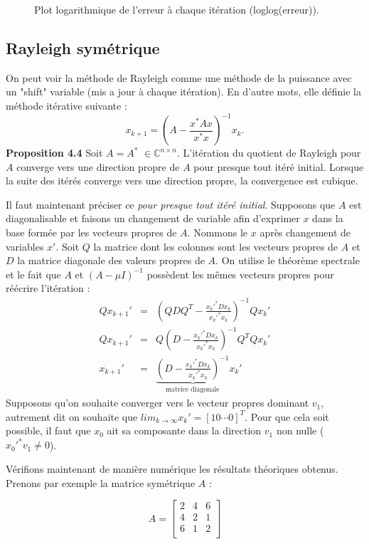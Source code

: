 \begin{figure}
\begin{tabular}{cc}
\end{tabular}
\caption{Plot logarithmique de l'erreur à chaque itération (loglog(erreur)). }
\label{plor_erreur}
\end{figure}

\subsection*{Rayleigh symétrique}
On peut voir la méthode de Rayleigh comme une méthode de la puissance avec un "shift" variable (mis a jour à chaque itération). En d'autre mots, elle définie la méthode itérative suivante : 
$$x_{k+1} = \left(  A- \frac{x^*Ax}{x^*x}  \right)^{-1} x_k.  $$
\textbf{Proposition 4.4} Soit $A = A^*$ $ \in \mathbb{C}^{n\times n}$. L'itération du quotient de Rayleigh pour $A$ converge vers une direction propre de $A$ pour presque tout itéré initial. Lorsque la suite des itérés converge vers une direction propre, la convergence est cubique. 

Il faut maintenant préciser ce \textit{pour presque tout itéré initial}. Supposons que $A$ est diagonalisable et faisons un changement de variable afin d'exprimer $x$ dans la base formée par les vecteurs propres de $A$. Nommons le $x$ après changement de variables $x'$. Soit $Q$ la matrice dont les colonnes sont les vecteurs propres de $A$ et $D$ la matrice diagonale des valeurs propres de $A$. On utilise le théorème spectrale et le fait que $A$ et $(A-\mu I)^{-1}$ possèdent les mêmes vecteurs propres pour réécrire l'itération : 
\begin{eqnarray}
Qx_{k+1}' & = &(Q D Q^T - \frac{x_k'^* D x_k}{x_k'^* x_k})^{-1} Qx_{k}'\\
Qx_{k+1}' & = & Q(D-\frac{x_k'^* D x_k}{x_k'^* x_k})^{-1}Q^T Qx_k'\\
x_{k+1}' & = & \underbrace{(D-\frac{x_k'^* D x_k}{x_k'^* x_k})^{-1}}_{\text{matrice diagonale}} x_k'
\end{eqnarray}
Supposons qu'on souhaite converger vers le vecteur propres dominant $v_1$, autrement dit on souhaite que $lim_{k\rightarrow \infty} x_k' = [1 0 \cdots 0]^T$. Pour que cela soit possible, il faut que $x_0$ ait sa composante dans la direction $v_1$ non nulle ($x_0'^* v_1 \neq 0$). 

Vérifions maintenant de manière numérique les résultats théoriques obtenus. Prenons par exemple la matrice symétrique $A$ : 

$$ A = \left[
\begin{array}{ccc}
  2 & 4 & 6  \\
  4 & 2 & 1 \\
  6 & 1 & 2 \\
\end{array}
\right]$$


